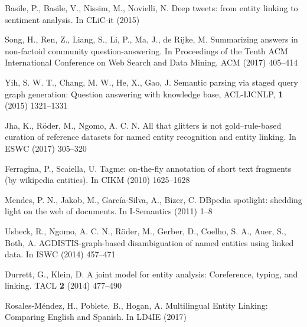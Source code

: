\documentclass{llncs}
\begin{document}
\begin{thebibliography}{99}
Basile, P., Basile, V., Nissim, M., Novielli, N. Deep tweets: from entity linking to sentiment analysis. In CLiC-it (2015)

Song, H., Ren, Z., Liang, S., Li, P., Ma, J., de Rijke, M. Summarizing answers in non-factoid community question-answering. In Proceedings of the Tenth ACM International Conference on Web Search and Data Mining, ACM (2017) 405--414

Yih, S. W. T., Chang, M. W., He, X., Gao, J. Semantic parsing via staged query graph generation: Question answering with knowledge base, ACL-IJCNLP, \textbf{1} (2015) 1321--1331 

Jha, K., R\"oder, M., Ngomo, A. C. N. All that glitters is not gold–rule-based curation of reference datasets for named entity recognition and entity linking. In ESWC (2017) 305--320

Ferragina, P., Scaiella, U. Tagme: on-the-fly annotation of short text fragments (by wikipedia entities). In CIKM (2010) 1625--1628

Mendes, P. N., Jakob, M., García-Silva, A., Bizer, C. DBpedia spotlight: shedding light on the web of documents. In I-Semantics (2011) 1--8

Usbeck, R., Ngomo, A. C. N., R\"oder, M., Gerber, D., Coelho, S. A., Auer, S., Both, A. AGDISTIS-graph-based disambiguation of named entities using linked data. In ISWC (2014) 457--471

Durrett, G., Klein, D. A joint model for entity analysis: Coreference, typing, and linking. TACL \textbf{2} (2014) 477--490

Rosales-M\'endez, H., Poblete, B., Hogan, A. Multilingual Entity Linking: Comparing English and Spanish. In LD4IE (2017)

\end{thebibliography}
\end{document}
